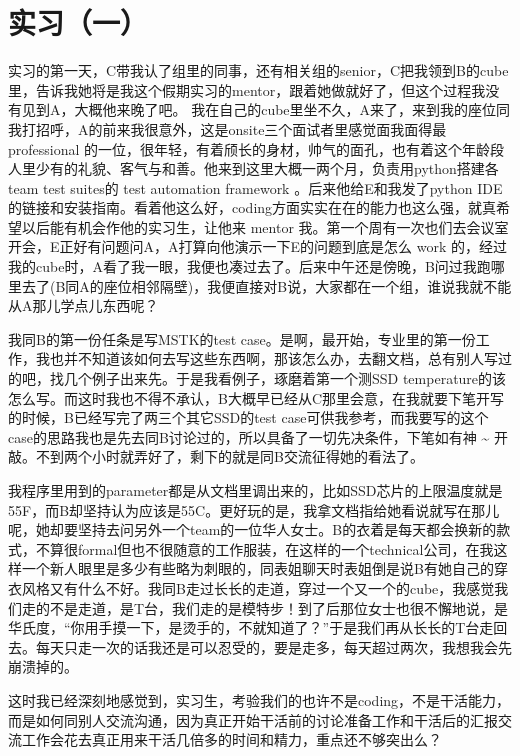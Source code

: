 \documentclass[12pt]{book}
\begin{document}
\section{实习（一）}
\label{sec-5-4}

实习的第一天，C带我认了组里的同事，还有相关组的senior，C把我领到B的cube里，告诉我她将是我这个假期实习的mentor，跟着她做就好了，但这个过程我没有见到A，大概他来晚了吧。
我在自己的cube里坐不久，A来了，来到我的座位同我打招呼，A的前来我很意外，这是onsite三个面试者里感觉面我面得最 professional 的一位，很年轻，有着颀长的身材，帅气的面孔，也有着这个年龄段人里少有的礼貌、客气与和善。他来到这里大概一两个月，负责用python搭建各team test suites的 test automation framework 。后来他给E和我发了python IDE的链接和安装指南。看着他这么好，coding方面实实在在的能力也这么强，就真希望以后能有机会作他的实习生，让他来 mentor 我。第一个周有一次也们去会议室开会，E正好有问题问A，A打算向他演示一下E的问题到底是怎么 work 的，经过我的cube时，A看了我一眼，我便也凑过去了。后来中午还是傍晚，B问过我跑哪里去了(B同A的座位相邻隔壁)，我便直接对B说，大家都在一个组，谁说我就不能从A那儿学点儿东西呢？

我同B的第一份任条是写MSTK的test case。是啊，最开始，专业里的第一份工作，我也并不知道该如何去写这些东西啊，那该怎么办，去翻文档，总有别人写过的吧，找几个例子出来先。于是我看例子，琢磨着第一个测SSD  temperature的该怎么写。而这时我也不得不承认，B大概早已经从C那里会意，在我就要下笔开写的时候，B已经写完了两三个其它SSD的test case可供我参考，而我要写的这个case的思路我也是先去同B讨论过的，所以具备了一切先决条件，下笔如有神 \textasciitilde{} 开敲。不到两个小时就弄好了，剩下的就是同B交流征得她的看法了。

我程序里用到的parameter都是从文档里调出来的，比如SSD芯片的上限温度就是55F，而B却坚持认为应该是55C。更好玩的是，我拿文档指给她看说就写在那儿呢，她却要坚持去问另外一个team的一位华人女士。B的衣着是每天都会换新的款式，不算很formal但也不很随意的工作服装，在这样的一个technical公司，在我这样一个新人眼里是多少有些略为刺眼的，同表姐聊天时表姐倒是说B有她自己的穿衣风格又有什么不好。我同B走过长长的走道，穿过一个又一个的cube，我感觉我们走的不是走道，是T台，我们走的是模特步！到了后那位女士也很不懈地说，是华氏度，“你用手摸一下，是烫手的，不就知道了？”于是我们再从长长的T台走回去。每天只走一次的话我还是可以忍受的，要是走多，每天超过两次，我想我会先崩溃掉的。

这时我已经深刻地感觉到，实习生，考验我们的也许不是coding，不是干活能力，而是如何同别人交流沟通，因为真正开始干活前的讨论准备工作和干活后的汇报交流工作会花去真正用来干活几倍多的时间和精力，重点还不够突出么？
\end{document}
